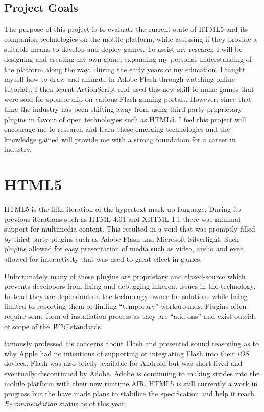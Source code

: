 \documentclass[final]{cmpreport}
\begin{document}
\subsection{Project Goals}
The purpose of this project is to evaluate the current state of HTML5 and its companion technologies on the mobile platform, while assessing if they provide a suitable means to develop and deploy games. To assist my research I will be designing and creating my own game, expanding my personal understanding of the platform along the way. During the early years of my education, I taught myself how to draw and animate in Adobe Flash through watching online tutorials. I then learnt ActionScript and used this new skill to make games that were sold for sponsorship on various Flash gaming portals. However, since that time the industry has been shifting away from using third-party proprietary plugins in favour of open technologies such as HTML5. I feel this project will encourage me to research and learn these emerging technologies and the knowledge gained will provide me with a strong foundation for a career in industry.

\section{HTML5}
HTML5 is the fifth iteration of the hypertext mark up language. During its previous iterations such as HTML 4.01 and XHTML 1.1 there was minimal support for multimedia content. This resulted in a void that was promptly filled by third-party plugins such as Adobe Flash and Microsoft Silverlight. Such plugins allowed for easy presentation of media such as video, audio and even allowed for interactivity that was used to great effect in games.

Unfortunately many of these plugins are proprietary and closed-source which prevents developers from fixing and debugging inherent issues in the technology. Instead they are dependant on the technology owner for solutions while being limited to reporting them or finding ``temporary'' workarounds. Plugins often require some form of installation process as they are ``add-ons'' and exist outside of scope of the \textit{W3C} standards.

\citet{Jobs} famously professed his concerns about Flash and presented sound reasoning as to why Apple had no intentions of supporting or integrating Flash into their \textit{iOS} devices. Flash was also briefly available for Android but was short lived and eventually discontinued by Adobe. Adobe is continuing to making strides into the mobile platform with their new runtime AIR\footnotemark. HTML5 is still currently a work in progress but the \cite{W3C} have made plans to stabilize the specification and help it reach \textit{Recommendation\footnotemark} status as of this year.
\end{document}
